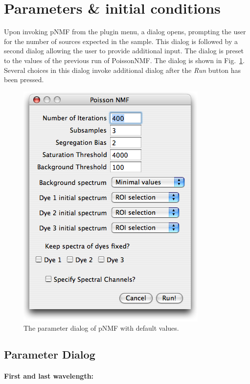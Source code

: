 \documentclass{article}
\newcommand{\FIG}[1]{Fig.~\ref{fig:#1}}
\begin{document}
\section*{Parameters \& initial conditions} Upon invoking pNMF from the plugin
menu, a dialog opens, prompting the user for the number of sources expected in
the sample. This dialog is followed by a second dialog allowing the user to
provide additional input. The dialog is preset to the values of the previous
run of PoissonNMF. The dialog is shown in \FIG{dialog}. Several choices in this
dialog invoke additional dialog after the \emph{Run} button has been pressed. 
\begin{figure}[htp]
\begin{center}
  \includegraphics[width=0.8\columnwidth]{parameterDialog}
  \caption{The parameter dialog of pNMF with default values.}
  \label{fig:dialog}
\end{center}
\end{figure}
\subsection*{Parameter Dialog}
\paragraph{First and last wavelength:}
\end{document}
